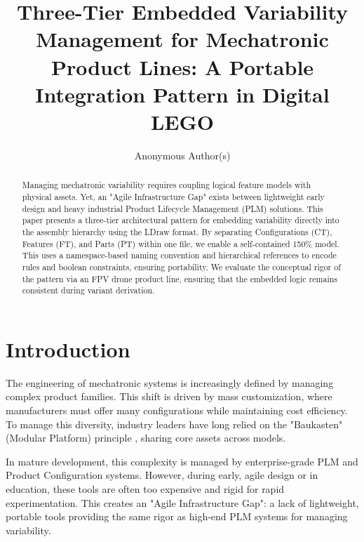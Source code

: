 \documentclass[runningheads]{llncs}
\begin{document}
%
\title{Three-Tier Embedded Variability Management for Mechatronic Product Lines: A Portable Integration Pattern in Digital LEGO}
%
%
\author{Anonymous Author(s)}
%
%
%
\maketitle
%
\begin{abstract}
Managing mechatronic variability requires coupling logical feature models with physical assets. Yet, an "Agile Infrastructure Gap" exists between lightweight early design and heavy industrial Product Lifecycle Management (PLM) solutions. This paper presents a three-tier architectural pattern for embedding variability directly into the assembly hierarchy using the LDraw format. By separating Configurations (CT), Features (FT), and Parts (PT) within one file, we enable a self-contained 150\% model. This uses a namespace-based naming convention and hierarchical references to encode rules and boolean constraints, ensuring portability. We evaluate the conceptual rigor of the pattern via an FPV drone product line, ensuring that the embedded logic remains consistent during variant derivation.

\end{abstract}

\section{Introduction}
The engineering of mechatronic systems is increasingly defined by managing complex product families. This shift is driven by mass customization, where manufacturers must offer many configurations while maintaining cost efficiency. To manage this diversity, industry leaders have long relied on the "Baukasten" (Modular Platform) principle \cite{lampon2017new}, sharing core assets across models.

In mature development, this complexity is managed by enterprise-grade PLM and Product Configuration systems. However, during early, agile design or in education, these tools are often too expensive and rigid for rapid experimentation. This creates an "Agile Infrastructure Gap": a lack of lightweight, portable tools providing the same rigor as high-end PLM systems for managing variability.
\end{document}
